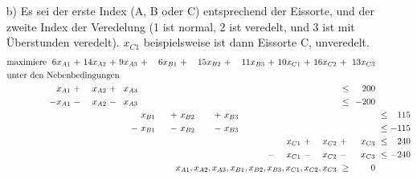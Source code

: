 \documentclass [a4paper,11pt]{article}
\begin{document}
\begin{enumerate}
\begin{enumerate}
                \newpage
            \item[b)]
                Es sei der erste Index (A, B oder C) entsprechend der Eissorte, und der zweite Index der Veredelung (1 ist normal, 2 ist veredelt, und 3 ist mit
                Überstunden veredelt). $x_{C1}$ beispielsweise ist dann Eissorte C, unveredelt.
                \begin{align*}
                \begin{alignedat}{12}
                & \text{maximiere } & 6x_{A1} &\ + &\ 14x_{A2} &\ + &\ 9x_{A3} &\ + &\ 6x_{B1} &\ + &\ 15x_{B2} &\ + &\ 11x_{B3} &\ + &\ 10x_{C1} &\ + &\ 16x_{C2} &\ + &\ 13x_{C3} \\
                & \rlap{unter den Nebenbedingungen} & & & & & & & & & & & & & & & & & \\
                &&  x_{A1} &\ + &\ x_{A2} &\ + &\ x_{A3} &    &      & & & & & & & & &\ \leq &\  200 \\
                && -x_{A1} &\ - &\ x_{A2} &\ - &\ x_{A3} &    &      & & & & & & & & &\ \leq &\ -200 \\
                &&  &  &  & & &\ x_{B1} &\ + &\ x_{B2} &\ + &\ x_{B3} & & & & & & & &\ \leq &\ 115 \\
                &&  &  &  & &\ - &\ x_{B1} &\ - &\ x_{B2} &\ - &\ x_{B3} & & & & & & & &\ \leq &\ -115 \\
                &&  &  &  & &  & & & & & & & &\ x_{C1} &\ + &\ x_{C2} &\ + &\ x_{C3} &\ \leq &\ 240 \\
                &&  &  &  & &  & & & & & & &\ - &\ x_{C1} &\ - &\ x_{C2} &\ - &\ x_{C3} &\ \leq &\ -240 \\
                && & & & & & & & & & & & & & & \llap{$x_{A1}, x_{A2}, x_{A3},x_{B1}, x_{B2}, x_{B3}, x_{C1}, x_{C2}, x_{C3}$} &\ \geq &\ 0
                \end{alignedat}
                \end{align*}

        \end{enumerate}

    \end{enumerate}
\end{document}
